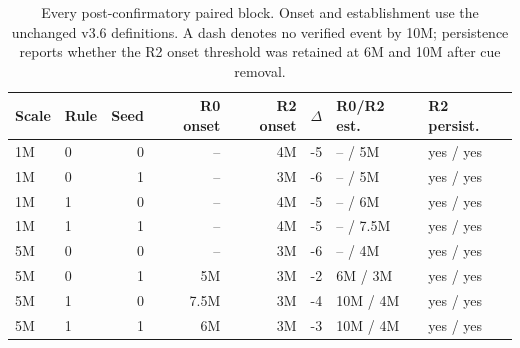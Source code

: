 \begin{table}[t]
\caption{Every post-confirmatory paired block. Onset and establishment use the
unchanged v3.6 definitions. A dash denotes no verified event by 10M; persistence
reports whether the R2 onset threshold was retained at 6M and 10M after cue
removal.}
\label{tab:scale-robustness-blocks}
\centering
\small
\begin{tabular}{llrrrrll}
\toprule
Scale & Rule & Seed & R0 onset & R2 onset & $\Delta$ & R0/R2 est. & R2 persist. \\
\midrule
1M & 0 & 0 & -- & 4M & -5 & -- / 5M & yes / yes \\
1M & 0 & 1 & -- & 3M & -6 & -- / 5M & yes / yes \\
1M & 1 & 0 & -- & 4M & -5 & -- / 6M & yes / yes \\
1M & 1 & 1 & -- & 4M & -5 & -- / 7.5M & yes / yes \\
5M & 0 & 0 & -- & 3M & -6 & -- / 4M & yes / yes \\
5M & 0 & 1 & 5M & 3M & -2 & 6M / 3M & yes / yes \\
5M & 1 & 0 & 7.5M & 3M & -4 & 10M / 4M & yes / yes \\
5M & 1 & 1 & 6M & 3M & -3 & 10M / 4M & yes / yes \\
\bottomrule
\end{tabular}
\end{table}
